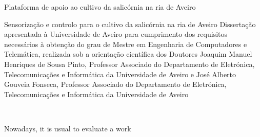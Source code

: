 

\TitlePage
         {\ThesisYear}
        {Plataforma de apoio ao cultivo da salicórnia na ria  de Aveiro}
\EndTitlePage
\titlepage\
\endtitlepage %


\TitlePage
\EndTitlePage


%
%
\newpage 

\TitlePage
  \HEADER{}{\ThesisYear}
        {Sensorização e controlo para o cultivo da salicórnia na ria de Aveiro}
  \vspace*{15mm}
  \TEXT{}
       {Dissertação apresentada à Universidade de Aveiro para cumprimento dos requisitos necessários à obtenção do grau
de Mestre em Engenharia de Computadores e Telemática,
realizada sob a orientação científica dos Doutores Joaquim Manuel Henriques de Sousa Pinto, Professor Associado do Departamento de Eletrónica, Telecomunicações e Informática da Universidade de Aveiro e José Alberto Gouveia Fonseca, Professor Associado do Departamento de Eletrónica, Telecomunicações e Informática da Universidade de Aveiro }

\EndTitlePage
\titlepage\
\endtitlepage %



\TitlePage
 \vspace*{55mm}

       {Nowadays, it is usual to evaluate a work 
       \\ \\ 
       }

